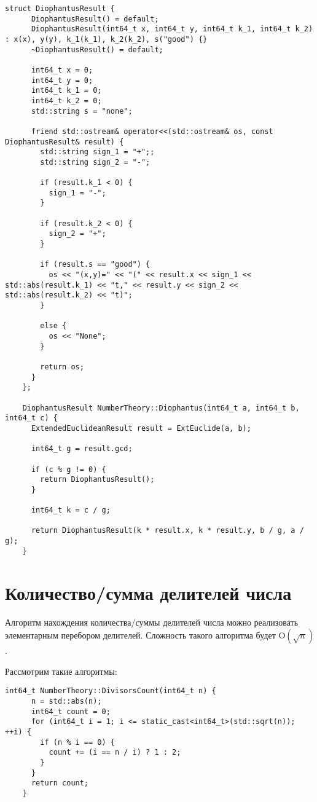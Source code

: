 \documentclass[12pt, a4paper, openany]{book}
\begin{document}
\begin{lstlisting}[breaklines=true]
    struct DiophantusResult {
      DiophantusResult() = default;
      DiophantusResult(int64_t x, int64_t y, int64_t k_1, int64_t k_2) : x(x), y(y), k_1(k_1), k_2(k_2), s("good") {}
      ~DiophantusResult() = default;
    
      int64_t x = 0;
      int64_t y = 0;
      int64_t k_1 = 0;
      int64_t k_2 = 0;
      std::string s = "none";
    
      friend std::ostream& operator<<(std::ostream& os, const DiophantusResult& result) {
        std::string sign_1 = "+";;
        std::string sign_2 = "-";
    
        if (result.k_1 < 0) {
          sign_1 = "-";
        }
    
        if (result.k_2 < 0) {
          sign_2 = "+";
        }
    
        if (result.s == "good") {
          os << "(x,y)=" << "(" << result.x << sign_1 << std::abs(result.k_1) << "t," << result.y << sign_2 << std::abs(result.k_2) << "t)";
        }
    
        else {
          os << "None";
        }
    
        return os;
      }
    };
    
    DiophantusResult NumberTheory::Diophantus(int64_t a, int64_t b, int64_t c) {
      ExtendedEuclideanResult result = ExtEuclide(a, b);
    
      int64_t g = result.gcd;
    
      if (c % g != 0) {
        return DiophantusResult(); 
      }
    
      int64_t k = c / g;
    
      return DiophantusResult(k * result.x, k * result.y, b / g, a / g);
    }
\end{lstlisting}

\section{Количество/сумма делителей числа}

    Алгоритм нахождения количества/суммы делителей числа можно реализовать элементарным перебором делителей. Сложность такого алгоритма будет $\text{O}(\sqrt{n})$. 

\noindent
    Рассмотрим такие алгоритмы:

\begin{lstlisting}[breaklines=true]
    int64_t NumberTheory::DivisorsCount(int64_t n) {
      n = std::abs(n);
      int64_t count = 0;
      for (int64_t i = 1; i <= static_cast<int64_t>(std::sqrt(n)); ++i) {
        if (n % i == 0) {
          count += (i == n / i) ? 1 : 2;
        }
      }
      return count;
    }
\end{lstlisting}
\end{document}
